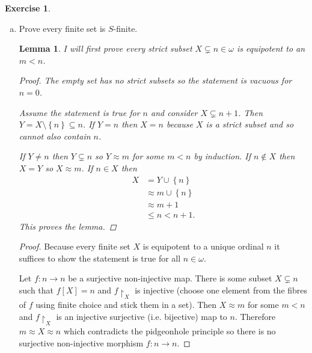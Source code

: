 \documentclass{article}
\newtheorem*{lemma}{Lemma}
\theoremstyle{definition}
\newtheorem{question}{Exercise}
\newcommand{\set}[1]{\left\{#1\right\}}
\newcommand{\restrict}{\upharpoonright}
\begin{document}
\begin{question}
    \begin{enumerate}[a.]
        \item Prove every finite set is \(S\)-finite.

              \begin{lemma}
                  I will first prove every strict subset \(X\subsetneq
                  n\in\omega\) is equipotent to an \(m<n\).

                  \begin{proof}
                      The empty set has no strict subsets so the statement is
                      vacuous for \(n=0\).

                      Assume the statement is true for \(n\) and consider
                      \(X\subsetneq n+1\). Then \(Y=X\setminus\set{n}\subseteq n\).
                      If \(Y=n\) then \(X=n\) because \(X\) is a strict subset and
                      so cannot also contain \(n\).

                      If \(Y\neq n\) then \(Y\subsetneq n\) so \(Y\approx m\) for
                      some \(m<n\) by induction. If \(n\notin X\) then \(X=Y\) so
                      \(X\approx m\). If \(n\in X\) then
                      \begin{align*}
                          X & =Y\cup\set{n}        \\
                            & \approx m\cup\set{n} \\
                            & \approx m+1          \\
                            & \leq n<n+1.
                      \end{align*}
                      This proves the lemma.
                  \end{proof}
              \end{lemma}

              \begin{proof}
                  Because every finite set \(X\) is equipotent to a unique
                  ordinal \(n\) it suffices to show the statement is true for
                  all \(n\in\omega\).

                  Let \(f:n\to n\) be a surjective non-injective map. There is
                  some subset \(X\subsetneq n\) such that \(f[X]=n\) and
                  \(f\restrict_{X}\) is injective (choose one element from the
                  fibres of \(f\) using finite choice and stick them in a set).
                  Then \(X\approx m\) for some \(m<n\) and \(f\restrict_{X}\) is
                  an injective surjective (i.e. bijective) map to \(n\).
                  Therefore \(m\approx X\approx n\) which contradicts the
                  pidgeonhole principle so there is no surjective non-injective
                  morphism \(f:n\to n\).
              \end{proof}


\end{enumerate}
\end{question}
\end{document}
